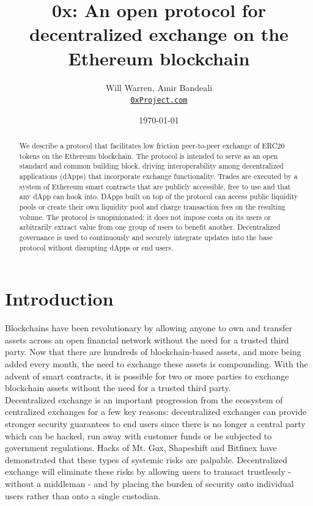 \documentclass[10pt]{article}
\begin{document}
\title{ \textbf{0x: An open protocol for decentralized exchange on the Ethereum blockchain} }
\author{Will Warren, Amir Bandeali \\ \href{0xProject.com}{\texttt{0xProject.com}}}
\date{\today}
\maketitle 

\begin{abstract}

\noindent We describe a protocol that facilitates low friction peer-to-peer exchange of ERC20 tokens on the Ethereum blockchain. The protocol is intended to serve as an open standard and common building block, driving interoperability among decentralized applications (dApps) that incorporate exchange functionality. Trades are executed by a system of Ethereum smart contracts that are publicly accessible, free to use and that any dApp can hook into. DApps built on top of the protocol can access public liquidity pools or create their own liquidity pool and charge transaction fees on the resulting volume. The protocol is unopinionated: it does not impose costs on its users or arbitrarily extract value from one group of users to benefit another. Decentralized governance is used to continuously and securely integrate updates into the base protocol without disrupting dApps or end users. \\

\end{abstract}

\pagebreak

\tableofcontents

\pagebreak

\section{Introduction}

Blockchains have been revolutionary by allowing anyone to own and transfer assets across an open financial network without the need for a trusted third party. Now that there are hundreds\cite{coinmarketcap} of blockchain-based assets, and more being added every month, the need to exchange these assets is compounding. With the advent of smart contracts, it is possible for two or more parties to exchange blockchain assets without the need for a trusted third party. \\

\noindent Decentralized exchange is an important progression from the ecosystem of centralized exchanges for a few key reasons: decentralized exchanges can provide stronger security guarantees to end users since there is no longer a central party which can be hacked, run away with customer funds or be subjected to government regulations. Hacks of Mt. Gox, Shapeshift and Bitfinex\cite{gox,shapeshift} have demonstrated that these types of systemic risks are palpable. Decentralized exchange will eliminate these risks by allowing users to transact trustlessly - without a middleman - and by placing the burden of security onto individual users rather than onto a single custodian. \\
\end{document}
